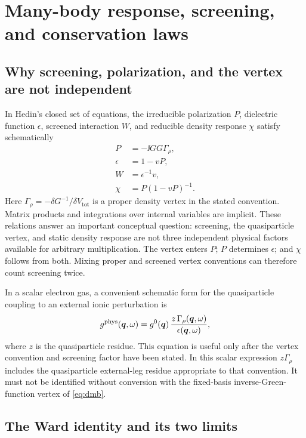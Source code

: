 \section{Many-body response, screening, and conservation laws}
\label{sec:manybody}

\subsection{Why screening, polarization, and the vertex are not independent}

In Hedin's closed set of equations, the irreducible polarization $P$, dielectric
function $\epsilon$, screened interaction $W$, and reducible density response
$\chi$ satisfy schematically \citep{Hedin1965,Giustino2017}
\begin{align}
  P &= -\ii GG\Gamma_\rho, \\
  \epsilon &= 1-vP, \\
  W &= \epsilon^{-1}v, \\
  \chi &= P(1-vP)^{-1}.
  \label{eq:hedinresponse}
\end{align}
Here $\Gamma_\rho=-\delta G^{-1}/\delta V_{\mathrm{tot}}$ is a proper density
vertex in the stated convention.  Matrix products and integrations over internal
variables are implicit.  These relations answer an important conceptual question:
screening, the quasiparticle vertex, and static density response are not three
independent physical factors available for arbitrary multiplication.  The vertex
enters $P$; $P$ determines $\epsilon$; and $\chi$ follows from both.  Mixing proper
and screened vertex conventions can therefore count screening twice.

In a scalar electron gas, a convenient schematic form for the quasiparticle
coupling to an external ionic perturbation is
\begin{equation}
  g^{\mathrm{phys}}(\bm{q},\omega)
  = g^0(\bm{q})\,
    \frac{z\,\Gamma_\rho(\bm{q},\omega)}
         {\epsilon(\bm{q},\omega)},
  \label{eq:gphysical}
\end{equation}
where $z$ is the quasiparticle residue.  This equation is useful only after the
vertex convention and screening factor have been stated.  In this scalar
expression $z\Gamma_\rho$ includes the quasiparticle external-leg residue
appropriate to that convention.  It must not be identified without conversion
with the fixed-basis inverse-Green-function vertex of \cref{eq:dmb}.

\subsection{The Ward identity and its two limits}

